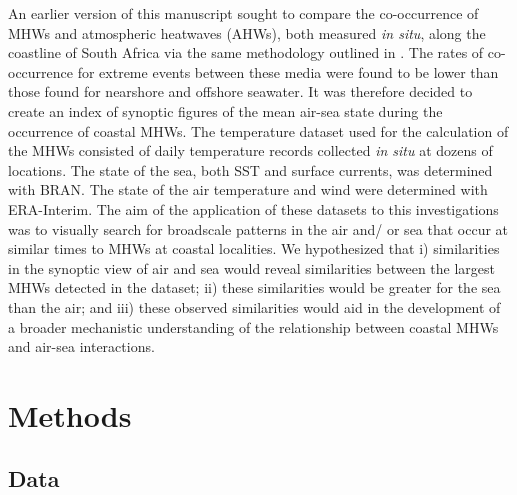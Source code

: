 \documentclass[a4paper,10pt,review]{elsarticle}
\begin{document}
An earlier version of this manuscript sought to compare the co-occurrence of MHWs and atmospheric heatwaves (AHWs), both measured \emph{in situ}, along the coastline of South Africa via the same methodology outlined in \citet{Schlegel2016}. The rates of co-occurrence for extreme events between these media were found to be lower than those found for nearshore and offshore seawater. It was therefore decided to create an index of synoptic figures of the mean air-sea state during the occurrence of coastal MHWs. The temperature dataset used for the calculation of the MHWs consisted of daily temperature records collected \emph{in situ} at dozens of locations. The state of the sea, both SST and surface currents, was determined with BRAN. The state of the air temperature and wind were determined with ERA-Interim. The aim of the application of these datasets to this investigations was to visually search for broadscale patterns in the air and/ or sea that occur at similar times to MHWs at coastal localities. We hypothesized that i) similarities in the synoptic view of air and sea would reveal similarities between the largest MHWs detected in the dataset; ii) these similarities would be greater for the sea than the air; and iii) these observed similarities would aid in the development of a broader mechanistic understanding of the relationship between coastal MHWs and air-sea interactions.

\section{Methods}
\subsection{Data}
\end{document}
